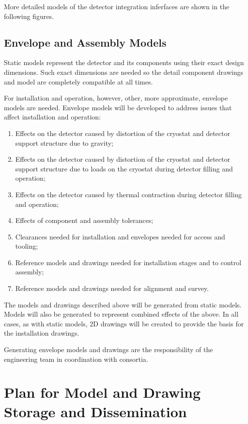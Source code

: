 More detailed models of the  detector integration
inferfaces are shown in the following figures.


\subsection{Envelope and Assembly Models}
\label{sec:fdsp-coord-integ-envelope}

Static models represent the detector and its components using their exact
design dimensions. Such exact dimensions are needed so the
detail component drawings and model are completely compatible at all
times.


For installation and operation, however, other, more approximate, envelope models are needed. Envelope models will be developed
to address issues that affect installation and operation:
\begin{enumerate}
 \item Effects on the detector caused by distortion of the cryostat
   and detector support structure due to gravity;
 \item Effects on the detector caused by distortion of the cryostat
   and detector support structure due to loads on the cryostat during detector filling and operation;
 \item Effects on the detector caused by thermal contraction during
   detector filling and operation;
 \item Effects of component and
   assembly tolerances;
 \item Clearances needed for installation and envelopes needed for
   access and tooling;
 \item Reference models and drawings needed for installation stages
   and to control assembly;
 \item Reference models and drawings needed for alignment and survey.
\end{enumerate}




The models and drawings described above will be generated from static
models. Models will also be generated to
represent combined effects of the above. In all cases, as with static models, 2D
drawings will be created to provide the basis for the installation
drawings.


Generating envelope models and drawings are the responsibility of the
 engineering team in coordination with consortia.




\section{Plan for Model and Drawing Storage and Dissemination}
\label{sec:fdsp-coord-integ-modelplan}

